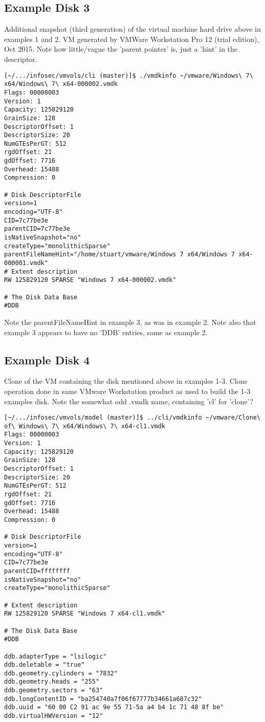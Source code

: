 \documentclass{article}
\begin{document}
\subsection{Example Disk 3}

Additional snapshot (third generation) of the virtual machine hard
drive above in examples 1 and 2. VM generated by VMWare Workstation
Pro 12 (trial edition), Oct 2015.  Note how little/vague the 'parent
pointer' is, just a 'hint' in the descriptor.

\begin{verbatim}
[~/.../infosec/vmvols/cli (master)]$ ./vmdkinfo ~/vmware/Windows\ 7\ x64/Windows\ 7\ x64-000002.vmdk 
Flags: 00000003
Version: 1
Capacity: 125829120
GrainSize: 128
DescriptorOffset: 1
DescriptorSize: 20
NumGTEsPerGT: 512
rgdOffset: 21
gdOffset: 7716
Overhead: 15488
Compression: 0

# Disk DescriptorFile
version=1
encoding="UTF-8"
CID=7c77be3e
parentCID=7c77be3e
isNativeSnapshot="no"
createType="monolithicSparse"
parentFileNameHint="/home/stuart/vmware/Windows 7 x64/Windows 7 x64-000001.vmdk"
# Extent description
RW 125829120 SPARSE "Windows 7 x64-000002.vmdk"

# The Disk Data Base 
#DDB
\end{verbatim}

Note the parentFileNameHint in example 3, as was in example 2.  Note
also that example 3 appears to have no 'DDB' entries, same as example 2.

\subsection{Example Disk 4}

Clone of the VM containing the disk mentioned above in examples 1-3.
Clone operation done in same VMware Workstation product as used to
build the 1-3 examples disk.  Note the somewhat odd .vmdk name,
containing 'cl' for 'clone'?

\begin{verbatim}
[~/.../infosec/vmvols/model (master)]$ ../cli/vmdkinfo ~/vmware/Clone\ of\ Windows\ 7\ x64/Windows\ 7\ x64-cl1.vmdk 
Flags: 00000003
Version: 1
Capacity: 125829120
GrainSize: 128
DescriptorOffset: 1
DescriptorSize: 20
NumGTEsPerGT: 512
rgdOffset: 21
gdOffset: 7716
Overhead: 15488
Compression: 0

# Disk DescriptorFile
version=1
encoding="UTF-8"
CID=7c77be3e
parentCID=ffffffff
isNativeSnapshot="no"
createType="monolithicSparse"

# Extent description
RW 125829120 SPARSE "Windows 7 x64-cl1.vmdk"

# The Disk Data Base 
#DDB

ddb.adapterType = "lsilogic"
ddb.deletable = "true"
ddb.geometry.cylinders = "7832"
ddb.geometry.heads = "255"
ddb.geometry.sectors = "63"
ddb.longContentID = "ba254740a7f06f67777b34661a687c32"
ddb.uuid = "60 00 C2 91 ac 9e 55 71-5a a4 b4 1c 71 48 8f be"
ddb.virtualHWVersion = "12"
\end{verbatim}
\end{document}
